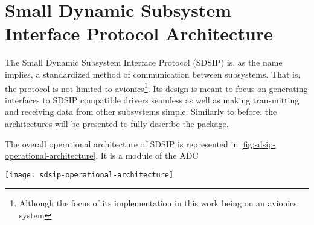 \section{Small Dynamic Subsystem Interface Protocol Architecture}
\label{sec:sdsip}

The Small Dynamic Subsystem Interface Protocol (SDSIP) is, as the name implies, a standardized
method of communication between subsystems. That is, the protocol is not limited to
avionics\footnote{Although
the focus of its implementation in this work being on an avionics system}. Its design is meant to
focus on generating interfaces to SDSIP compatible drivers seamless as well as making transmitting
and receiving data from other subsystems simple. Similarly to before, the architectures will be
presented to fully describe the package.

The overall operational architecture of SDSIP is represented in
\autoref{fig:sdsip-operational-architecture}. It is a module of the ADC

\begin{figure*}[ht]
  \begin{center}
    \texttt{[image: sdsip-operational-architecture]}
  \end{center}
  \caption{}
  \label{fig:sdsip-operational-architecture}
\end{figure*}

